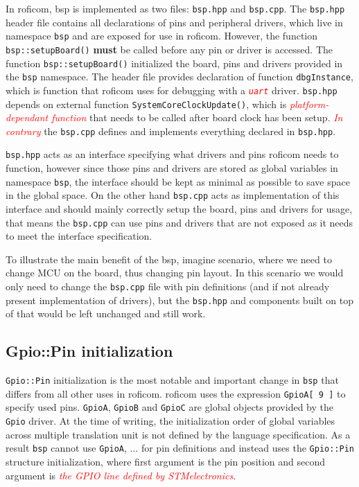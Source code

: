 \documentclass[
  digital,     %
  oneside,     %
  nosansbold,  %
  nocolorbold, %
  lof,         %
  lot,         %
]{fithesis4}
\newcommand{\TODO}[1]{\textcolor{red}{\textit{#1}}}
\begin{document}
In \acrshort{roficom}, \acrshort{bsp} is implemented as two files: \verb|bsp.hpp| and \verb|bsp.cpp|. The \verb|bsp.hpp| header file contains all declarations of pins and peripheral drivers, which live in namespace \lstinline{bsp} and are exposed for use in \acrshort{roficom}. However, the function \lstinline{bsp::setupBoard()} \textbf{must} be called before any pin or driver is accessed. The function \lstinline{bsp::setupBoard()} initialized the board, pins and drivers provided in the \lstinline{bsp} namespace. The header file provides declaration of function \lstinline{dbgInstance}, which is function that \acrshort{roficom} uses for debugging with a \TODO{ \texttt{uart} } driver. \verb|bsp.hpp| depends on external function \lstinline|SystemCoreClockUpdate()|, which is \TODO{platform-dependant function} that needs to be called after board clock has been setup. \TODO{In contrary} the \verb|bsp.cpp| defines and implements everything declared in \verb|bsp.hpp|. 

\verb|bsp.hpp| acts as an interface specifying what drivers and pins \acrshort{roficom} needs to function, however since those pins and drivers are stored as global variables in namespace \lstinline{bsp}, the interface should be kept as minimal as possible to save space in the global space. On the other hand \verb|bsp.cpp| acts as implementation of this interface and should mainly correctly setup the board, pins and drivers for usage, that means the \verb|bsp.cpp| can use pins and drivers that are not exposed as it needs to meet the interface specification.

To illustrate the main benefit of the \acrshort{bsp}, imagine scenario, where we need to change MCU on the board, thus changing pin layout. In this scenario we would only need to change the \verb|bsp.cpp| file with pin definitions (and if not already present implementation of drivers), but the \verb|bsp.hpp| and components built on top of that would be left unchanged and still work.

\subsection{Gpio::Pin initialization}
\lstinline{Gpio::Pin} initialization is the most notable and important change in \lstinline{bsp} that differs from all other uses in \acrshort{roficom}. \acrshort{roficom} uses the expression \lstinline{GpioA[ 9 ]} to specify used pins. \lstinline{GpioA}, \lstinline{GpioB} and \lstinline{GpioC} are global objects provided by the \lstinline{Gpio} driver. At the time of writing, the initialization order of global variables across multiple translation unit is not defined by the language specification. As a result \lstinline{bsp} cannot use \lstinline{GpioA}, ... for pin definitions and instead uses the \lstinline{Gpio::Pin} structure initialization, where first argument is the pin position and second argument is \TODO{the GPIO line defined by STMelectronics}.
\end{document}
